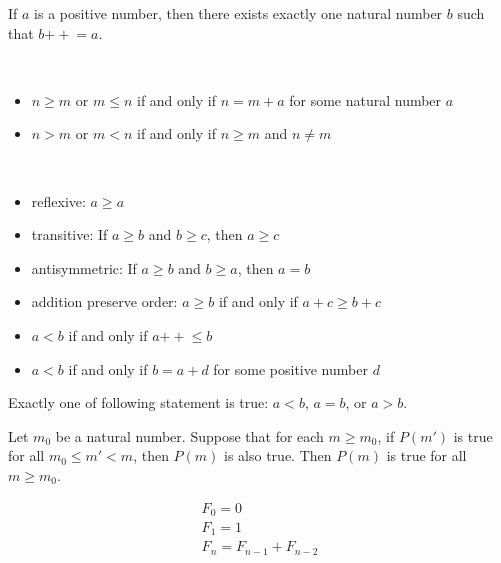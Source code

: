 \documentclass{blog}
\begin{document}
\begin{lemma}
  If $a$ is a positive number, then there exists exactly one natural number $b$
  such that $b{++} = a$.
\end{lemma}

\begin{definition}[order]~
  \begin{itemize}
  \item $n \geq m$ or $m \leq n$ if and only if $n=m+a$ for some natural number $a$
  \item $n>m$ or $m<n$ if and only if $n \geq m$ and $n \neq m$
  \end{itemize}
\end{definition}

\begin{proposition}~
  \begin{itemize}
  \item reflexive: $a \geq a$
  \item transitive: If $a \geq b$ and $b \geq c$, then $a \geq c$
  \item antisymmetric: If $a \geq b$ and $b \geq a$, then $a=b$
  \item addition preserve order: $a \geq b$ if and only if $a+c \geq b+c$
  \item $a<b$ if and only if $a{++} \leq b$
  \item $a<b$ if and only if $b=a+d$ for some positive number $d$
  \end{itemize}
\end{proposition}

\begin{proposition}
  Exactly one of following statement is true:
  $a<b$, $a=b$, or $a>b$.
\end{proposition}

\begin{proposition}
  Let $m_{0}$ be a natural number.
  Suppose that for each $m \geq m_{0}$, if $P(m')$ is true for all $m_{0} \leq m' < m$,
  then $P(m)$ is also true. Then $P(m)$ is true for all $m \geq m_{0}$.
\end{proposition}

\begin{example}
  \begin{gather}
    F_{0} = 0 \\
    F_{1} = 1 \\
    F_{n} = F_{n-1} + F_{n-2}
  \end{gather}
\end{example}
\end{document}
